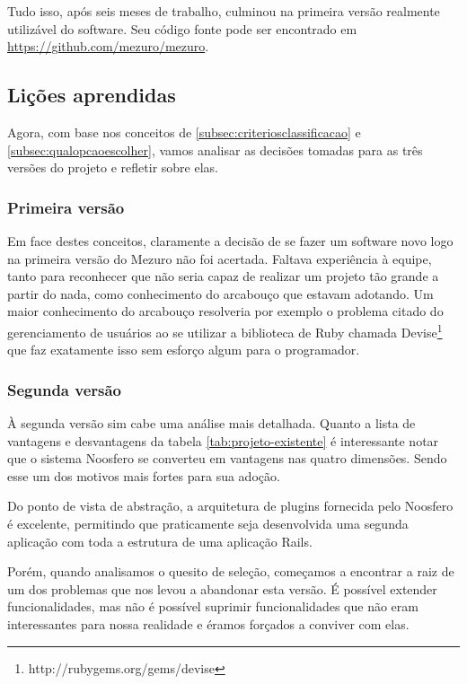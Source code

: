 \documentclass[12pt]{article}
\begin{document}
  Tudo isso, após seis meses de trabalho, culminou na primeira versão realmente utilizável do software. Seu código fonte pode ser encontrado em \url{https://github.com/mezuro/mezuro}.

  \subsection{Lições aprendidas} \label{subsec:licoes-aprendidas}
  Agora, com base nos conceitos de \ref{subsec:criteriosclassificacao} e \ref{subsec:qualopcaoescolher}, vamos analisar as decisões tomadas para as três versões do projeto e refletir sobre elas.

    \subsubsection{Primeira versão}
    Em face destes conceitos, claramente a decisão de se fazer um software novo logo na primeira versão do Mezuro não foi acertada. Faltava experiência à equipe, tanto para reconhecer que não seria capaz de realizar um projeto tão grande a partir do nada, como conhecimento do arcabouço que estavam adotando. Um maior conhecimento do arcabouço resolveria por exemplo o problema citado do gerenciamento de usuários ao se utilizar a biblioteca de Ruby chamada Devise\footnote{http://rubygems.org/gems/devise} que faz exatamente isso sem esforço algum para o programador.

    \subsubsection{Segunda versão} \label{subsubsec:segundaversao}
    À segunda versão sim cabe uma análise mais detalhada. Quanto a lista de vantagens e desvantagens da tabela \ref{tab:projeto-existente} é interessante notar que o sistema Noosfero se converteu em vantagens nas quatro dimensões. Sendo esse um dos motivos mais fortes para sua adoção.

    Do ponto de vista de abstração, a arquitetura de plugins fornecida pelo Noosfero é excelente, permitindo que praticamente seja desenvolvida uma segunda aplicação com toda a estrutura de uma aplicação Rails.

    Porém, quando analisamos o quesito de seleção, começamos a encontrar a raiz de um dos problemas que nos levou a abandonar esta versão. É possível extender funcionalidades, mas não é possível suprimir funcionalidades que não eram interessantes para nossa realidade e éramos forçados a conviver com elas.
\end{document}
